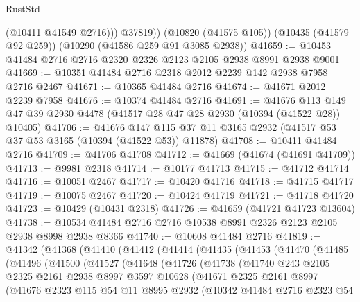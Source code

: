 \begin{lexlean}{RustStd}
\begin{coremodule}
            (@10411 @41549 @2716)))
        @37819))
    (@10820 (@41575 @105))
    (@10435 (@41579 @92 @259))
    (@10290 (@41586 @259 @91 @3085 @2938))
@41659 := @10453 @41484 @2716 @2716 @2320 @2326 @2123 @2105 @2938 @8991 @2938 @9001
@41669 := @10351 @41484 @2716 @2318 @2012 @2239 @142 @2938 @7958 @2716 @2467
@41671 := @10365 @41484 @2716
@41674 := @41671 @2012 @2239 @7958
@41676 := @10374 @41484 @2716
@41691 := @41676
    @113
    @149
    @47
    @39
    @2930
    @4478
    (@41517 @28 @47 @28 @2930 (@10394 (@41522 @28)) @10405)
@41706 := @41676
    @147
    @115
    @37
    @11
    @3165
    @2932
    (@41517 @53 @37 @53 @3165 (@10394 (@41522 @53)) @11878)
@41708 := @10411 @41484 @2716
@41709 := @41706 @41708
@41712 := @41669 (@41674 (@41691 @41709))
@41713 := @9981 @2318
@41714 := @10177 @41713
@41715 := @41712 @41714
@41716 := @10051 @2467
@41717 := @10420 @41716
@41718 := @41715 @41717
@41719 := @10075 @2467
@41720 := @10424 @41719
@41721 := @41718 @41720
@41723 := @10429 (@10431 @2318)
@41726 := @41659 (@41721 @41723 @13604)
@41738 := @10534 @41484 @2716 @2716 @10538 @8991 @2326 @2123 @2105 @2938 @8998 @2938 @8366
@41740 := @10608 @41484 @2716
@41819 := @41342
    (@41368
      (@41410
        (@41412
          (@41414
            (@41435
              (@41453
                (@41470
                  (@41485
                    (@41496
                      (@41500
                        (@41527
                          (@41648
                            (@41726
                              (@41738
                                (@41740
                                  @243
                                  @2105
                                  @2325
                                  @2161
                                  @2938
                                  @8997
                                  @3597
                                  @10628
                                  (@41671
                                    @2325
                                    @2161
                                    @8997
                                    (@41676
                                      @2323
                                      @115
                                      @54
                                      @11
                                      @8995
                                      @2932
                                      (@10342
                                        @41484
                                        @2716
                                        @2323
                                        @54

\end{coremodule}
\end{lexlean}
